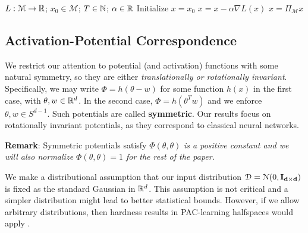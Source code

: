 \begin{algorithm}[hb]
 \caption{$x = GD(L,x_0, T,\alpha$)}
   \label{GD}
\begin{algorithmic}
    $L: \mathcal{M} \to {\mathbb{R}}$; $x_0 \in \mathcal{M}$; $T\in {\mathbb{N}}$; $\alpha\in {\mathbb{R}}$
   \State Initialize $x = x_0$
   \State $x = x - \alpha\nabla L(x)$
   \State $x = \Pi_\mathcal{M} x$
   \EndFor
\end{algorithmic}
\end{algorithm}

\subsection{Activation-Potential Correspondence}
We restrict our attention to potential (and activation) functions with some natural symmetry, so they are either {\it translationally or rotationally invariant}. Specifically, we may write $\Phi= h(\theta-w)$ for some function $h(x)$  in the first case, with $\theta, w \in {\mathbb{R}}^d$. In the second case, $\Phi = h(\theta^Tw)$ and we enforce $\theta, w \in S^{d-1}$. Such potentials are called {\bf symmetric}. Our results focus on rotationally invariant potentials, as they correspond to classical neural networks.

{\bf Remark}: Symmetric potentials satisfy $\Phi(\theta,\theta)$ {\it is
  a positive constant and we will also normalize
  $\Phi(\theta,\theta) = 1$ for the rest of the paper.} 
  
We make a distributional assumption that our input distribution
$\mathcal{D} = \mathcal{N}(0, {\bf I_{d\times d}})$ is fixed as the
standard Gaussian in ${\mathbb{R}}^d$. This assumption is not critical and a
simpler distribution might lead to better statistical bounds. However, if we allow arbitrary distributions, then hardness results in PAC-learning
halfspaces would apply \cite{klivans2006cryptographic}.

